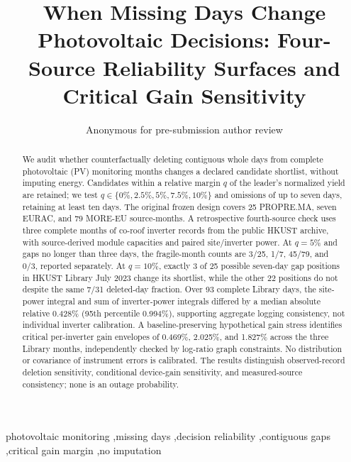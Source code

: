\documentclass[preprint,12pt]{elsarticle}
\begin{document}
\begin{frontmatter}
\title{When Missing Days Change Photovoltaic Decisions: Four-Source Reliability Surfaces and Critical Gain Sensitivity}
\author{Anonymous for pre-submission author review}
\begin{abstract}
We audit whether counterfactually deleting contiguous whole days from complete photovoltaic (PV) monitoring months changes a declared candidate shortlist, without imputing energy. Candidates within a relative margin $q$ of the leader's normalized yield are retained; we test $q\in\{0\%,2.5\%,5\%,7.5\%,10\%\}$ and omissions of up to seven days, retaining at least ten days. The original frozen design covers 25 PROPRE.MA, seven EURAC, and 79 MORE-EU source-months. A retrospective fourth-source check uses three complete months of co-roof inverter records from the public HKUST archive, with source-derived module capacities and paired site/inverter power. At $q=5\%$ and gaps no longer than three days, the fragile-month counts are 3/25, 1/7, 45/79, and 0/3, reported separately. At $q=10\%$, exactly 3 of 25 possible seven-day gap positions in HKUST Library July 2023 change its shortlist, while the other 22 positions do not despite the same 7/31 deleted-day fraction. Over 93 complete Library days, the site-power integral and sum of inverter-power integrals differed by a median absolute relative 0.428\% (95th percentile 0.994\%), supporting aggregate logging consistency, not individual inverter calibration. A baseline-preserving hypothetical gain stress identifies critical per-inverter gain envelopes of 0.469\%, 2.025\%, and 1.827\% across the three Library months, independently checked by log-ratio graph constraints. No distribution or covariance of instrument errors is calibrated. The results distinguish observed-record deletion sensitivity, conditional device-gain sensitivity, and measured-source consistency; none is an outage probability.
\end{abstract}
\begin{keyword}
photovoltaic monitoring \sep missing days \sep decision reliability \sep contiguous gaps \sep critical gain margin \sep no imputation
\end{keyword}
\end{frontmatter}
\end{document}
